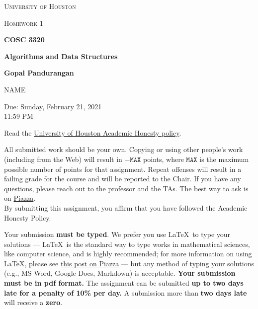 \documentclass[draft]{article}
\begin{document}
\begin{titlepage}
    \begin{center}
        {\scshape\LARGE University of Houston\par}
        \vspace{1cm}
        {\scshape\Large Homework 1 \par}
        \vspace{1.5cm}
        {\huge\bfseries COSC 3320 \par}
        {\huge\bfseries Algorithms and Data Structures \par}
        \vspace{0.5cm}
        {\large\bfseries Gopal Pandurangan\par}
        \vspace{2cm}
        {\Large NAME\par}
        \vspace{0.5cm}
        {\large \par} Due: Sunday, February 21, 2021\\11:59 PM
    \end{center}


    Read the \href{https://www.uh.edu/provost/policies-resources/honesty/_documents-honesty/academic-honesty-policy.pdf}{University of Houston Academic Honesty policy}.

    \begin{tcolorbox}[title=Academic Honesty Policy,colback=red!15,colframe=red!65!black,fonttitle=\bfseries]All submitted work should be your own. Copying or using other people's work (including from the Web) will result in \(-\texttt{MAX}\) points, where \(\texttt{MAX}\) is the maximum possible number of points for that assignment. Repeat offenses will result in a failing grade for the course and will be reported to the Chair. If you have any questions, please reach out to the professor and the TAs. The best way to ask is on \href{https://piazza.com/uh/spring2021/cosc3320/home}{Piazza}.\\

        By submitting this assignment, you affirm that you have followed the Academic Honesty Policy.
    \end{tcolorbox}

    Your submission \textbf{must be typed}. We prefer you use \LaTeX~to type your solutions --- \LaTeX~is the standard way to type works in mathematical sciences, like computer science, and is highly recommended; for more information on using \LaTeX, please see \href{https://piazza.com/class/kjxhee6ctqe6cj?cid=8}{this post on Piazza} --- but any method of typing your solutions (e.g., MS Word, Google Docs, Markdown) is acceptable. \textbf{Your submission must be in pdf format.} The assignment can be submitted \textbf{up to two days late for a penalty of 10\% per day.} A submission more than \textbf{two days late} will receive a \textbf{zero}.


\end{titlepage}
\end{document}
